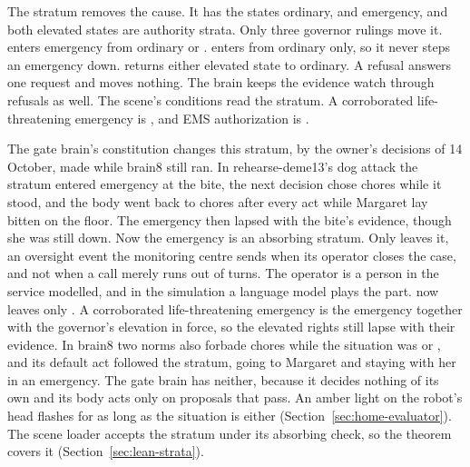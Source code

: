 The stratum  removes the cause. It has the states ordinary,  and
emergency, and both elevated states are authority strata. Only three governor rulings move it.
 enters emergency from ordinary or .  enters
 from ordinary only, so it never steps an emergency down.  returns either
elevated state to ordinary. A refusal answers one request and moves nothing. The brain keeps the
evidence watch through refusals as well. The scene's conditions read the stratum. A corroborated
life-threatening emergency is , and EMS authorization is
.

The gate brain's constitution changes this stratum, by the owner's decisions of 14 October, made
while brain8 still ran.
In rehearse-deme13's dog attack the stratum entered emergency at the bite, the next decision chose
chores while it stood, and the body went back to chores after every act while Margaret lay bitten
on the floor. The emergency then lapsed with the bite's evidence, though she was still down. Now
the emergency is an absorbing stratum. Only  leaves it, an
oversight event the monitoring centre sends when its operator closes the case, and not when a call
merely runs out of turns. The operator is a person in the service modelled, and in the simulation
a language model plays the part.  now leaves only . A corroborated
life-threatening emergency is the emergency together with the governor's elevation in force, so
the elevated rights still lapse with their evidence. In brain8 two norms also forbade chores while
the situation was  or , and its default act followed the stratum,
going to Margaret and staying with her in an emergency. The gate brain has neither, because it
decides nothing of its own and its body acts only on proposals that pass. An amber light on the
robot's head flashes for as long as the situation is either (Section~\ref{sec:home-evaluator}). The scene loader accepts the stratum under its absorbing check, so the theorem
 covers it (Section~\ref{sec:lean-strata}).

